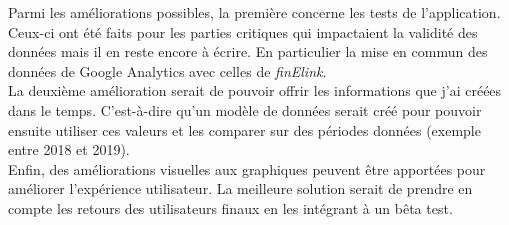 Parmi les améliorations possibles, la première concerne les tests de l'application. Ceux-ci ont été faits pour les parties critiques qui impactaient la validité des données mais il en reste encore à écrire. En particulier la mise en commun des données de Google Analytics avec celles de \textit{finElink}.\\

La deuxième amélioration serait de pouvoir offrir les informations que j'ai créées dans le temps. C'est-à-dire qu'un modèle de données serait créé pour pouvoir ensuite utiliser ces valeurs et les comparer sur des périodes données (exemple entre 2018 et 2019).\\

Enfin, des améliorations visuelles aux graphiques peuvent être apportées pour améliorer l'expérience utilisateur. La meilleure solution serait de prendre en compte les retours des utilisateurs finaux en les intégrant à un bêta test.